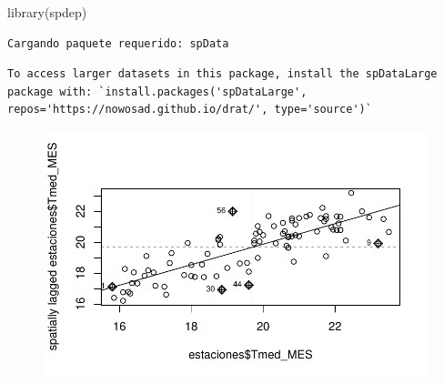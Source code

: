\documentclass[
  letterpaper,
  DIV=11,
  numbers=noendperiod]{scrreprt}
\newenvironment{Shaded}{\begin{snugshade}}{\end{snugshade}}
\newcommand{\AttributeTok}[1]{\textcolor[rgb]{0.40,0.45,0.13}{#1}}
\newcommand{\FunctionTok}[1]{\textcolor[rgb]{0.28,0.35,0.67}{#1}}
\newcommand{\NormalTok}[1]{\textcolor[rgb]{0.00,0.23,0.31}{#1}}
\newcommand{\SpecialCharTok}[1]{\textcolor[rgb]{0.37,0.37,0.37}{#1}}
\begin{document}
\begin{Shaded}
\begin{Highlighting}[]
\FunctionTok{library}\NormalTok{(spdep)}
\end{Highlighting}
\end{Shaded}

\begin{verbatim}
Cargando paquete requerido: spData
\end{verbatim}

\begin{verbatim}
To access larger datasets in this package, install the spDataLarge
package with: `install.packages('spDataLarge',
repos='https://nowosad.github.io/drat/', type='source')`
\end{verbatim}

\begin{Shaded}
\end{Shaded}

\begin{figure}[H]

{\centering \includegraphics{04_AutocorrelacionEspacial_files/figure-pdf/unnamed-chunk-14-1.pdf}

}

\end{figure}

\begin{Shaded}
\end{Shaded}
\end{document}
